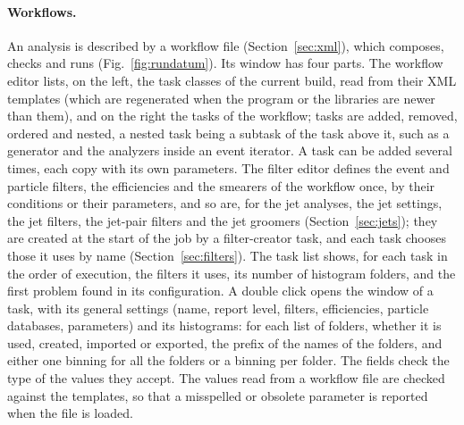 \paragraph{Workflows.}
An analysis is described by a workflow file (Section~\ref{sec:xml}), which  composes, checks and
runs (Fig.~\ref{fig:rundatum}). Its window has four parts. The workflow editor lists, on the left, the task classes of
the current build, read from their XML templates (which are regenerated when the program or the libraries are newer
than them), and on the right the tasks of the workflow; tasks are added, removed, ordered and nested, a nested task
being a subtask of the task above it, such as a generator and the analyzers inside an event iterator. A task can be
added several times, each copy with its own parameters. The filter editor defines the event and particle filters, the
efficiencies and the smearers of the workflow once, by their conditions or their parameters, and so are, for the jet
analyses, the jet settings, the jet filters, the jet-pair filters and the jet groomers (Section~\ref{sec:jets}); they are created at the
start of the job by a filter-creator task, and each task chooses those it uses by name (Section~\ref{sec:filters}).
The task list shows, for each task in the order of execution, the filters it uses, its number of histogram folders,
and the first problem found in its configuration. A double click opens the window of a task, with its general
settings (name, report level, filters, efficiencies, particle databases, parameters) and its histograms: for each list
of folders, whether it is used, created, imported or exported, the prefix of the names of the folders, and either one
binning for all the folders or a binning per folder. The fields check the type of the values they accept. The values
read from a workflow file are checked against the templates, so that a misspelled or obsolete parameter is reported
when the file is loaded.


